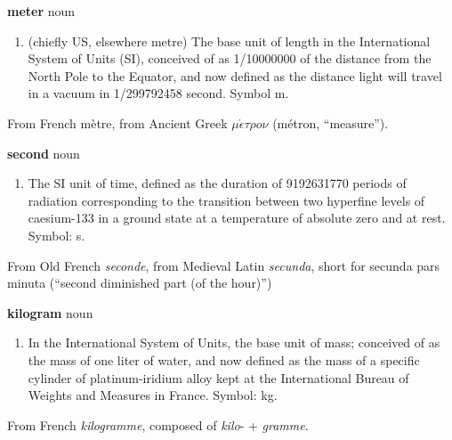 \documentclass[
    DIV=12,
    BCOR=0mm,
    pagenumber=off,
    paper=11in:8.5in,
    pagesize,
]{scrartcl}
\begin{document}
\hfill\vfill
\begin{minipage}{\linewidth}
    \textbf{meter}
     noun
    \begin{enumerate}
        \item (chiefly US, elsewhere metre)
            The base unit of length in the International System of Units (SI),
            conceived of as \num{1/10000000} of the distance from the North Pole to the Equator,
            and now defined as the distance light will travel in a vacuum in \num{1/299792458} second.
            Symbol m.
    \end{enumerate}
    From French m\`{e}tre,
        from Ancient Greek $\mu\acute{\epsilon}\tau\rho{}o\nu$ (m\'{e}tron, ``measure''). \\
\end{minipage}
\vfill
\newpage


\hfill\vfill
\begin{minipage}{\linewidth}
    \textbf{second}
     noun
    \begin{enumerate}
        \item The SI unit of time, defined as the duration of \num{9 192 631 770}
            periods of radiation corresponding to the transition between two
            hyperfine levels of caesium-\num{133} in a ground state at a
            temperature of absolute zero and at rest.
            Symbol: s.
    \end{enumerate}
    From Old French \emph{seconde},
        from Medieval Latin \emph{secunda},
        short for secunda pars minuta (``second diminished part (of the hour)'')
\end{minipage}
\vfill
\newpage


\hfill\vfill
\begin{minipage}{\linewidth}
    \textbf{kilogram}
     noun
    \begin{enumerate}
        \item In the International System of Units, the base unit of mass;
            conceived of as the mass of one liter of water, and now defined
            as the mass of a specific cylinder of platinum-iridium alloy
            kept at the International Bureau of Weights and Measures in France.
            Symbol: kg.
    \end{enumerate}
    From French \emph{kilogramme}, composed of \emph{kilo}- + \emph{gramme}.
\end{minipage}
\vfill
\newpage
\end{document}

